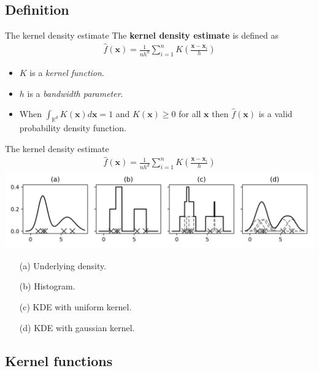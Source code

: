 \documentclass[18pt]{beamer}
\begin{document}
\subsection{Definition}

\begin{frame}{The kernel density estimate}
	The \textbf{kernel density estimate} is defined as
	\begin{align*}
		\hat{f}(\bm{x}) = \frac{1}{n h^d} \sum_{i=1}^{n} K\left(\frac{\bm{x} - \bm{x}_i}{h} \right)
	\end{align*}
	
	\begin{itemize}
		\item $K$ is a \textit{kernel function}.
		\item $h$ is a \textit{bandwidth parameter}.
	\end{itemize}
	\begin{itemize}
		\item When $\int_{\mathbb{R}^d} K(\bm{x}) d\bm{x} = 1$ and $K(\bm{x}) \geq 0$ for all $\bm{x}$ then $\hat{f}(\bm{x})$ is a valid probability density function.
	\end{itemize}
\end{frame}


\begin{frame}{The kernel density estimate}
	\begin{align*}
		\hat{f}(\bm{x}) = \frac{1}{n h^d} \sum_{i=1}^{n} K\left(\frac{\bm{x} - \bm{x}_i}{h} \right)
	\end{align*}
	\includegraphics[width=\textwidth]{figures/kde-kernel-density-estimates}
	\vspace*{-5mm}
	\tiny
	\begin{itemize}
		\item[(a)] Underlying density.
		\item[(b)] Histogram.
		\item[(c)] KDE with uniform kernel.
		\item[(d)] KDE with gaussian kernel.
	\end{itemize}
\end{frame}


\subsection{Kernel functions}
\end{document}
